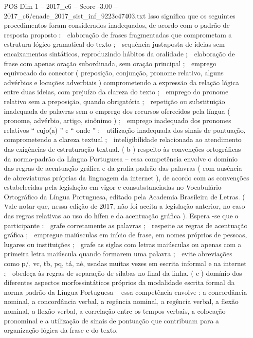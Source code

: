 \begin{textsample}{POS Dim 1 – 2017\_c6 – Score -3.00 – 2017\_c6/enade\_2017\_sist\_inf\_9223c47403.txt}
Isso significa que os seguintes procedimentos foram considerados inadequados, de acordo com o padrão de resposta proposto :  elaboração de frases fragmentadas que comprometam a estrutura lógico-gramatical do texto ;  sequência justaposta de ideias sem encaixamentos sintáticos, reproduzindo hábitos da oralidade ;  elaboração de frase com apenas oração subordinada, sem oração principal ;  emprego equivocado do conector ( preposição, conjunção, pronome relativo, alguns advérbios e locuções adverbiais ) comprometendo a expressão da relação lógica entre duas ideias, com prejuízo da clareza do texto ;  emprego do pronome relativo sem a preposição, quando obrigatória ;  repetição ou substituição inadequada de palavras sem o emprego dos recursos oferecidos pela língua ( pronome, advérbio, artigo, sinônimo ) ;  emprego inadequado dos pronomes relativos “ cujo(a) ” e “ onde ” ;  utilização inadequada dos sinais de pontuação, comprometendo a clareza textual ;  inteligibilidade relacionada ao atendimento das exigências de estruturação textual. ( b ) respeito às convenções ortográficas da norma-padrão da Língua Portuguesa – essa competência envolve o domínio das regras de acentuação gráfica e da grafia padrão das palavras ( com ausência de abreviaturas próprias da linguagem da internet ), de acordo com as convenções estabelecidas pela legislação em vigor e consubstanciadas no Vocabulário Ortográfico da Língua Portuguesa, editado pela Academia Brasileira de Letras. ( Vale notar que, nessa edição de 2017, não foi aceita a legislação anterior, no caso das regras relativas ao uso do hífen e da acentuação gráfica ).
Espera -se que o participante :  grafe corretamente as palavras ;  respeite as regras de acentuação gráfica ;  empregue maiúsculas em início de frase, em nomes próprios de pessoas, lugares ou instituições ;  grafe as siglas com letras maiúsculas ou apenas com a primeira letra maiúscula quando formarem uma palavra ;  evite abreviações como p/, vc, tb, pq, tá, né, usadas muitas vezes em escrita informal e na internet ;  obedeça às regras de separação de sílabas no final da linha. ( c ) domínio dos diferentes aspectos morfossintáticos próprios da modalidade escrita formal da norma-padrão da Língua Portuguesa – essa competência envolve : a concordância nominal, a concordância verbal, a regência nominal, a regência verbal, a flexão nominal, a flexão verbal, a correlação entre os tempos verbais, a colocação pronominal e a utilização de sinais de pontuação que contribuam para a organização lógica da frase e do texto.

\end{textsample}
